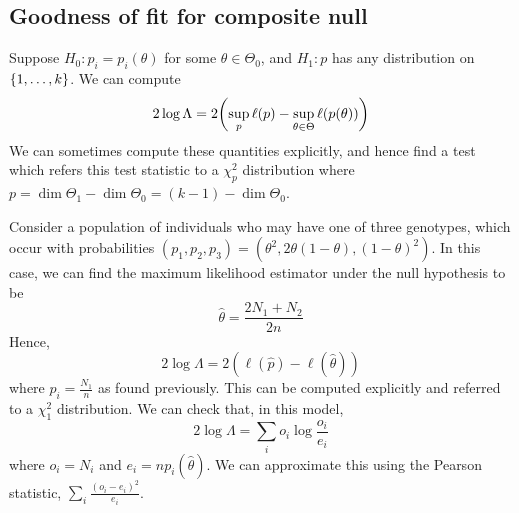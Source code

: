 \subsection{Goodness of fit for composite null}
Suppose \( H_0 \colon p_i = p_i(\theta) \) for some \( \theta \in \Theta_0 \), and \( H_1 \colon p \) has any distribution on \( \qty{1, \dots, k} \).
We can compute
\[
	2 \log \Lambda = 2 \qty( \sup_p \ell(p) - \sup_{\theta \in \Theta} \ell(p(\theta)) )
\]
We can sometimes compute these quantities explicitly, and hence find a test which refers this test statistic to a \( \chi^2_p \) distribution where \( p = \dim \Theta_1 - \dim \Theta_0 = (k-1) - \dim \Theta_0 \).
\begin{example}
	Consider a population of individuals who may have one of three genotypes, which occur with probabilities \( (p_1, p_2, p_3) = (\theta^2, 2\theta(1-\theta), (1-\theta)^2) \).
	In this case, we can find the maximum likelihood estimator under the null hypothesis to be
	\[
		\hat \theta = \frac{2N_1 + N_2}{2n}
	\]
	Hence,
	\[
		2 \log \Lambda = 2(\ell(\hat p) - \ell(\hat \theta))
	\]
	where \( \hat p_i = \frac{N_1}{n} \) as found previously.
	This can be computed explicitly and referred to a \( \chi^2_1 \) distribution.
	We can check that, in this model,
	\[
		2 \log \Lambda = \sum_i o_i \log \frac{o_i}{e_i}
	\]
	where \( o_i = N_i \) and \( e_i = n p_i(\hat \theta) \).
	We can approximate this using the Pearson statistic, \( \sum_i \frac{(o_i - e_i)^2}{e_i} \).
\end{example}

